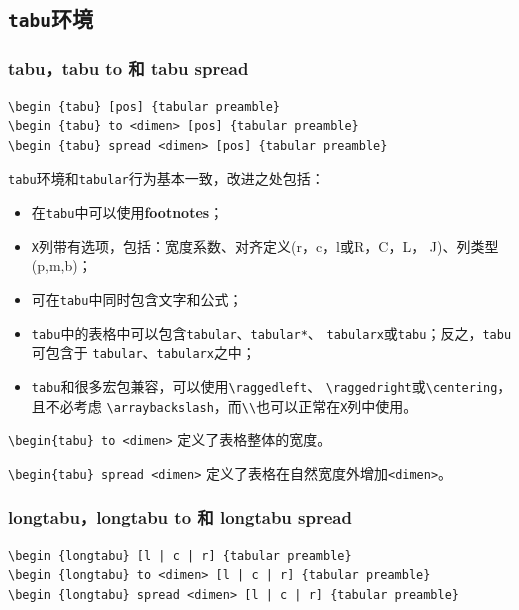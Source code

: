 \documentclass{article}
\begin{document}
\subsection{\texttt{tabu}环境}

\subsubsection{tabu，tabu to 和 tabu spread}
\begin{verbatim}
\begin {tabu} [pos] {tabular preamble}
\begin {tabu} to <dimen> [pos] {tabular preamble}
\begin {tabu} spread <dimen> [pos] {tabular preamble}
\end{verbatim}

\texttt{tabu}环境和\texttt{tabular}行为基本一致，改进之处包括：
\begin{itemize}
\item 在\texttt{tabu}中可以使用\textbf{footnotes}；
\item \texttt{X}列带有选项，包括：宽度系数、对齐定义(r，c，l或R，C，L，
  J)、列类型(p,m,b)；
\item 可在\texttt{tabu}中同时包含文字和公式；
\item \texttt{tabu}中的表格中可以包含\texttt{tabular}、\texttt{tabular*}、
  \texttt{tabularx}或\texttt{tabu}；反之，\texttt{tabu}可包含于
  \texttt{tabular}、\texttt{tabularx}之中；
\item \texttt{tabu}和很多宏包兼容，可以使用\verb!\raggedleft!、
  \verb!\raggedright!或\verb!\centering!，且不必考虑
  \verb!\arraybackslash!，而\verb!\\!也可以正常在\texttt{X}列中使用。
\end{itemize}

\verb!\begin{tabu} to <dimen>! 定义了表格整体的宽度。

\verb!\begin{tabu} spread <dimen>! 定义了表格在自然宽度外增加\verb!<dimen>!。

\subsubsection{longtabu，longtabu to 和 longtabu spread}
\begin{verbatim}
\begin {longtabu} [l | c | r] {tabular preamble}
\begin {longtabu} to <dimen> [l | c | r] {tabular preamble}
\begin {longtabu} spread <dimen> [l | c | r] {tabular preamble}
\end{verbatim}
\end{document}
